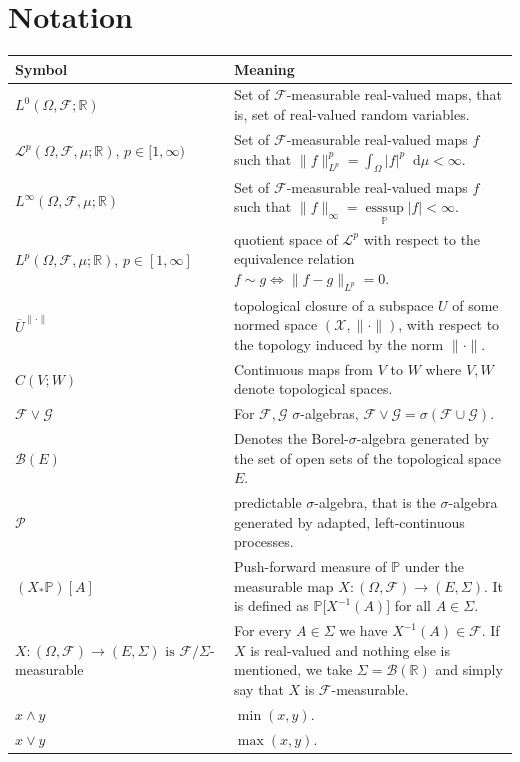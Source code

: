 \documentclass[11pt,a4paper,twoside,openany]{report}
\numberwithin{equation}{section}
\newcommand{\diff}{\mathop{}\!\mathrm{d}}
\theoremstyle{plain} %
\theoremstyle{definition} %
\theoremstyle{remark} %
\begin{document}
\chapter*{Notation}
\noindent
\vspace{0.75\baselineskip}
\noindent\begin{tabularx}{\textwidth}{@{}l X@{}}
\toprule
\textbf{Symbol} & \textbf{Meaning}\\
\midrule
$ L^0(\Omega,\mathcal{F};\mathbb{R})$ & Set of $\mathcal{F}$-measurable real-valued maps, that is, set of real-valued random variables.\\
$\mathcal{L}^p(\Omega,\mathcal{F},\mu;\mathbb{R})$, $p\in[1,\infty)$ & Set of $\mathcal{F}$-measurable real-valued maps $f$ such that $\lVert f\rVert_{L^p}^p=\int_{\Omega}|f|^p\diff \mu<\infty$.\\
$L^{\infty}(\Omega,\mathcal{F},\mu;\mathbb{R})$ & Set of $\mathcal{F}$-measurable real-valued maps $f$ such that $\lVert f\rVert_{\infty}=\underset{\mathbb{P}}{\operatorname*{ess\sup}}|f|<\infty$.\\
$L^p(\Omega, \mathcal{F},\mu;\mathbb{R})$, $p\in [1,\infty]$ & quotient space of $\mathcal{L}^p$ with respect to the equivalence relation $f\sim g\iff \lVert f-g\rVert_{L^p}=0$.\\
\(\overline{U}^{\lVert\cdot\rVert}\) & topological closure of a subspace \(U\) of some normed space \((\mathcal{X},\lVert\cdot\rVert)\), with respect to the topology induced by the norm \(\lVert\cdot\rVert\).
\\
$C(V;W)$ & Continuous maps from $V$ to $W$ where $V,W$ denote topological spaces.\\
\(\mathcal{F}\vee\mathcal{G}\) & For \(\mathcal{F},\mathcal{G}\) \(\sigma\)-algebras, \(\mathcal{F}\vee\mathcal{G}=\sigma(\mathcal{F}\cup\mathcal{G})\).
\\
$\mathcal{B}(E)$&Denotes the Borel-\(\sigma\)-algebra generated by the set of open sets of the topological space \(E\).
\\
$\mathcal{P}$& predictable \(\sigma\)-algebra, that is the \(\sigma\)-algebra generated by adapted, left-continuous processes.
\\
$(X_*\mathbb{P})[A]$ & Push-forward measure of $\mathbb{P}$ under the measurable map $X:(\Omega,\mathcal{F})\to(E,\Sigma)$. It is defined as $\mathbb{P}\big[X^{-1}(A)\big]$ for all $A\in\Sigma$.\\
$X:(\Omega,\mathcal{F})\to(E,\Sigma) \text{ is } \mathcal{F}/\Sigma$-measurable & For every \(A\in \Sigma\) we have \(X^{-1}(A)\in\mathcal{F}\). If \(X\) is real-valued and nothing else is mentioned, we take \(\Sigma=\mathcal{B}(\mathbb{R})\) and simply say that \(X\) is  \(\mathcal{F}\)-measurable. 
\\
\(x\wedge y\) & \(\min(x,y)\).
\\
\(x\vee y\) & \(\max(x,y)\).
\\
\bottomrule
\end{tabularx}
\end{document}
